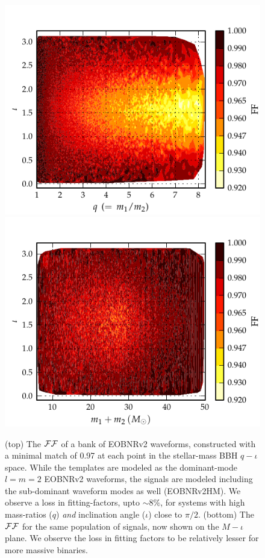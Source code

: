 \begin{figure}
\centering
\includegraphics[keepaspectratio=true, scale=0.04, clip=false, height=0.45\textheight]{figures/eobpnmetric/EOBHMvsEOB22incvsq-PRD.pdf} %
\includegraphics[keepaspectratio=true, scale=0.04, clip=false, height=0.45\textheight]{figures/eobpnmetric/EOBHMvsEOB22incvsM-PRD.pdf} %
\caption{\label{fig:incvsM_eob22eobhm} (top) The $\mathcal{FF}$ of a
bank of EOBNRv2 waveforms, constructed with a minimal match of 0.97 at each
point in the stellar-mass BBH $q-\iota$ space. While the templates are
modeled as the dominant-mode $l=m=2$ EOBNRv2 waveforms, the signals are modeled 
including the sub-dominant waveform modes as well (EOBNRv2HM). 
We observe a loss in fitting-factors, upto $\sim 8\%$, for 
systems with high mass-ratios ($q$) \textit{and} inclination angle ($\iota$) 
close to $\pi/2$.
(bottom) The $\mathcal{FF}$ for the same population of signals, now shown on the $M-\iota$
plane. We observe the loss in fitting factors to be relatively lesser
for more massive binaries.}
\end{figure}
